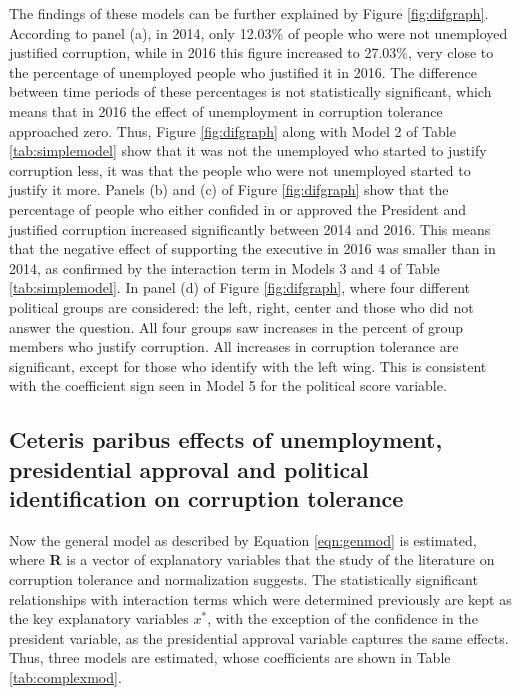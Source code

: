 \documentclass[12pt,a4]{article}\usepackage[]{graphicx}\usepackage[]{xcolor}
\begin{document}
The findings of these models can be further explained by Figure \ref{fig:difgraph}. According to panel (a), in 2014, only 12.03\% of people who were not unemployed justified corruption, while in 2016 this figure increased to 27.03\%, very close to the percentage of unemployed people who justified it in 2016. The difference between time periods of these percentages is not statistically significant, which means that in 2016 the effect of unemployment in corruption tolerance approached zero. Thus, Figure \ref{fig:difgraph} along with Model 2 of Table \ref{tab:simplemodel} show that it was not the unemployed who started to justify corruption less, it was that the people who were not unemployed started to justify it more. Panels (b) and (c) of Figure \ref{fig:difgraph} show that the percentage of people who either confided in or approved the President and justified corruption increased significantly  between 2014 and 2016. This means that the negative effect of supporting the executive in 2016 was smaller than in 2014, as confirmed by the interaction term in Models 3 and 4 of Table \ref{tab:simplemodel}. In panel (d) of Figure \ref{fig:difgraph}, where four different political groups are considered: the left, right, center and those who did not answer the question. All four groups saw increases in the percent of group members who justify corruption. All increases in corruption tolerance are significant, except for those who identify with the left wing. This is consistent with the coefficient sign seen in Model 5 for the political score variable. 






\subsection{Ceteris paribus effects of unemployment, presidential approval and political identification on corruption tolerance}

Now the general model as described by Equation \ref{eqn:genmod} is estimated, where \textbf{R} is a vector of explanatory variables that the study of the literature on corruption tolerance and normalization suggests. The statistically significant relationships with interaction terms which were determined previously are kept as the key explanatory variables $x^*$, with the exception of the confidence in the president variable, as the presidential approval variable captures the same effects. Thus, three models are estimated, whose coefficients are shown in Table \ref{tab:complexmod}.
\end{document}
